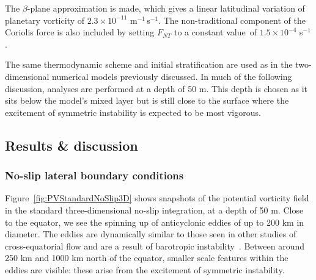 The $\beta$-plane approximation is made, which gives a linear latitudinal variation of planetary vorticity of $2.3\times 10^{-11}$ m$^{-1}$\,s$^{-1}$. The non-traditional component of the Coriolis force is also included by setting $F_{NT}$ to a constant value\footnotemark~of $1.5\times 10^{-4}$ s$^{-1}$.


The same thermodynamic scheme and initial stratification are used as in the two-dimensional numerical models previously discussed. In much of the following discussion, analyses are performed at a depth of 50 m. This depth is chosen as it sits below the model's mixed layer but is still close to the surface where the excitement of symmetric instability is expected to be most vigorous.

\subsection{Results \& discussion}
\label{subsec:3DResults}
\subsubsection{No-slip lateral boundary conditions}
Figure~\ref{fig:PVStandardNoSlip3D} shows snapshots of the potential vorticity field in the standard three-dimensional no-slip integration, at a depth of 50 m. Close to the equator, we see the spinning up of anticyclonic eddies of up to 200 km in diameter. The eddies are dynamically similar to those seen in other studies of cross-equatorial flow and are a result of barotropic instability~\citep[e.g.][]{Edwards1998I, Edwards1998II, Jochum2003, Goes2009}. Between around 250 km and 1000 km north of the equator, smaller scale features within the eddies are visible: these arise from the excitement of symmetric instability.

